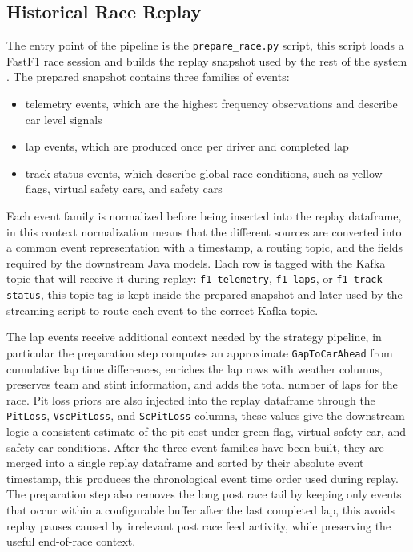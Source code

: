 \subsection{Historical Race Replay}
\label{sec:historical_race_replay}

The entry point of the pipeline is the \texttt{prepare\_race.py} script, this script loads a FastF1 race session and builds the replay snapshot used by the rest of the 
system \cite{fastf1docs}.
The prepared snapshot contains three families of events:
\begin{itemize}
    \item telemetry events, which are the highest frequency observations and describe car level signals
    \item lap events, which are produced once per driver and completed lap
    \item track-status events, which describe global race conditions, such as yellow flags, virtual safety cars, and safety cars
\end{itemize}

Each event family is normalized before being inserted into the replay dataframe, in this context normalization means that the different sources are converted into a common
event representation with a timestamp, a routing topic, and the fields required by the downstream Java models. Each row is tagged with the Kafka topic that will receive it
during replay: \texttt{f1-telemetry}, \texttt{f1-laps}, or \texttt{f1-track-status}, this topic tag is kept inside the prepared snapshot and later used by the streaming script
to route each event to the correct Kafka topic.

The lap events receive additional context needed by the strategy pipeline, in particular the preparation step computes an approximate \texttt{GapToCarAhead} from cumulative
lap time differences, enriches the lap rows with weather columns, preserves team and stint information, and adds the total number of laps for the race. Pit loss priors are also
injected into the replay dataframe through the \texttt{PitLoss}, \texttt{VscPitLoss}, and \texttt{ScPitLoss} columns, these values give the downstream logic a consistent
estimate of the pit cost under green-flag, virtual-safety-car, and safety-car conditions.
After the three event families have been built, they are merged into a single replay dataframe and sorted by their absolute event timestamp, this produces the chronological
event time order used during replay. The preparation step also removes the long post race tail by keeping only events that occur within a configurable buffer after the last
completed lap, this avoids replay pauses caused by irrelevant post race feed activity, while preserving the useful end-of-race context.

